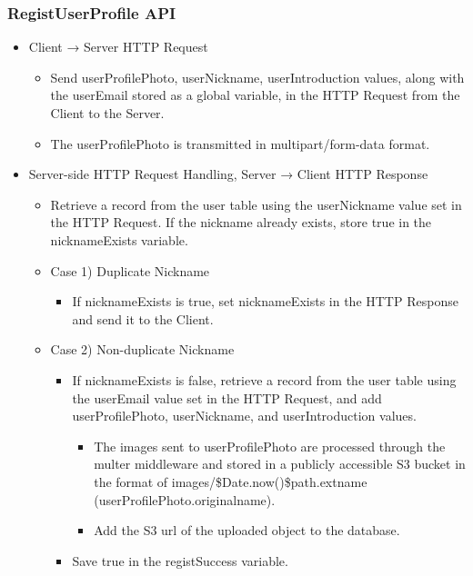 \documentclass[conference]{IEEEtran}
\begin{document}
\subsubsection{RegistUserProfile API}
\begin{itemize}
    \item Client → Server HTTP Request
    \begin{itemize}
        \item Send userProfilePhoto, userNickname, userIntroduction values, along with the userEmail stored as a global variable, in the HTTP Request from the Client to the Server.
        \item The userProfilePhoto is transmitted in multipart/form-data format.
        \\
    \end{itemize}
    \item Server-side HTTP Request Handling, Server → Client HTTP Response
    \begin{itemize}
        \item Retrieve a record from the user table using the userNickname value set in the HTTP Request. If the nickname already exists, store true in the nicknameExists variable.
        \item Case 1) Duplicate Nickname
        \begin{itemize}
            \item If nicknameExists is true, set nicknameExists in the HTTP Response and send it to the Client.
        \end{itemize}
        \item Case 2) Non-duplicate Nickname
        \begin{itemize}
            \item If nicknameExists is false, retrieve a record from the user table using the userEmail value set in the HTTP Request, and add userProfilePhoto, userNickname, and userIntroduction values.
            \begin{itemize}
                \item The images sent to userProfilePhoto are processed through the multer middleware and stored in a publicly accessible S3 bucket in the format of images/\${Date.now()}\${path.extname\\(userProfilePhoto.originalname)}.
                \item Add the S3 url of the uploaded object to the database.
            \end{itemize}
            \item Save true in the registSuccess variable.

\end{itemize}
\end{itemize}
\end{itemize}
\end{document}
